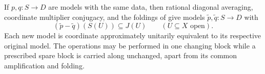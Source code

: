 \begin{lemma}\label{un:alignment}
If $p,q:S\to D$ are models with the same data, then rational diagonal
averaging, coordinate multiplier conjugacy, and the foldings of
 give models $\widetilde p,\widetilde q:S\to D$ with
\begin{equation}\label{un:local-difference}
 (\widetilde p-\widetilde q)(S(U))\subseteq J(U)
 \qquad(U\subseteq X\text{ open}).
\end{equation}
Each new model is coordinate approximately unitarily equivalent to
its respective original model.  The operations may be performed in
one changing block while a prescribed spare block is carried along
unchanged, apart from its common amplification and folding.
\end{lemma}

